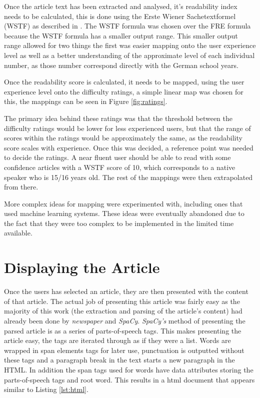 Once the article text has been extracted and analysed, it's readability index needs to be calculated, this is done using the Erste Wiener Sachetextformel (WSTF) as described in \textcite{bamberger1984}. The WSTF formula was chosen over the FRE formula because the WSTF formula has a smaller output range. This smaller output range allowed for two things the first was easier mapping onto the user experience level as well as a better understanding of the approximate level of each individual number, as those number correspond directly with the German school years. 

Once the readability score is calculated, it needs to be mapped, using the user experience level onto the difficulty ratings, a simple linear map was chosen for this, the mappings can be seen in Figure \ref{fig:ratings}.



The primary idea behind these ratings was that the threshold between the difficulty ratings would be lower for less experienced users, but that the range of scores within the ratings would be approximately the same, as the readability score scales with experience. Once this was decided, a reference point was needed to decide the ratings. A near fluent user should be able to read with some confidence articles with a WSTF score of 10, which corresponds to a native speaker who is 15/16 years old. The rest of the mappings were then extrapolated from there. 

More complex ideas for mapping were experimented with, including ones that used machine learning systems. These ideas were eventually abandoned due to the fact that they were too complex to be implemented in the limited time available. 

\section{Displaying the Article}

Once the users has selected an article, they are then presented with the content of that article. The actual job of presenting this article was fairly easy as the majority of this work (the extraction and parsing of the article's content) had already been done by \textit{newspaper} and \textit{SpaCy}. \textit{SpaCy's} method of presenting the parsed article is as a series of parts-of-speech tags. This makes presenting the article easy, the tags are iterated through as if they were a list. Words are wrapped in span elements tags for later use, punctuation is outputted without these tags and a paragraph break in the text starts a new paragraph in the HTML. In addition the span tags used for words have data attributes storing the parts-of-speech tags and root word. This results in a html document that appears similar to Listing \ref{lst:html}.

